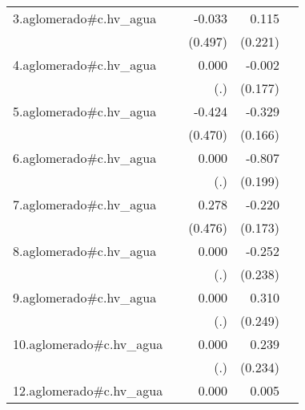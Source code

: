 {\begin{longtable}{l*{4}{D{.}{.}{-1}}}
\addlinespace
3.aglomerado#c.hv\_agua&                     &      -0.033         &       0.115         &                     \\
            &                     &     (0.497)         &     (0.221)         &                     \\
\addlinespace
4.aglomerado#c.hv\_agua&                     &       0.000         &      -0.002         &                     \\
            &                     &         (.)         &     (0.177)         &                     \\
\addlinespace
5.aglomerado#c.hv\_agua&                     &      -0.424         &      -0.329\sym{*}  &                     \\
            &                     &     (0.470)         &     (0.166)         &                     \\
\addlinespace
6.aglomerado#c.hv\_agua&                     &       0.000         &      -0.807\sym{***}&                     \\
            &                     &         (.)         &     (0.199)         &                     \\
\addlinespace
7.aglomerado#c.hv\_agua&                     &       0.278         &      -0.220         &                     \\
            &                     &     (0.476)         &     (0.173)         &                     \\
\addlinespace
8.aglomerado#c.hv\_agua&                     &       0.000         &      -0.252         &                     \\
            &                     &         (.)         &     (0.238)         &                     \\
\addlinespace
9.aglomerado#c.hv\_agua&                     &       0.000         &       0.310         &                     \\
            &                     &         (.)         &     (0.249)         &                     \\
\addlinespace
10.aglomerado#c.hv\_agua&                     &       0.000         &       0.239         &                     \\
            &                     &         (.)         &     (0.234)         &                     \\
\addlinespace
12.aglomerado#c.hv\_agua&                     &       0.000         &       0.005         &                     \\

\end{longtable}}
